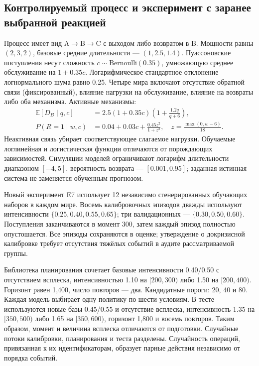 \documentclass[runningheads]{llncs}
\begin{document}
\subsection{Контролируемый процесс и эксперимент с заранее выбранной реакцией}
Процесс имеет вид A$\rightarrow$B$\rightarrow$C с выходом либо возвратом в B. Мощности равны $(2,3,2)$, базовые средние длительности --- $(1,2.5,1.4)$. Пуассоновские поступления несут сложность $c\sim\mathrm{Bernoulli}(0.35)$, умножающую среднее обслуживание на $1+0.35c$. Логарифмическое стандартное отклонение логнормального шума равно 0.25. Четыре мира включают отсутствие обратной связи (фиксированный), влияние нагрузки на обслуживание, влияние на возвраты либо оба механизма. Активные механизмы:
\begin{align}\label{eq:truth}
\mathbb E[D_B\mid q,c]&=2.5(1+0.35c)\left(1+\frac{1.2q}{q+6}\right),\\
P(R=1\mid w,c)&=0.04+0.03c+\frac{0.45z^2}{1+z^2},\quad z=\frac{\max(0,w-6)}{18}.
\end{align}
Неактивная связь убирает соответствующее слагаемое нагрузки. Обучаемые логлинейная и логистическая функции отличаются от порождающих зависимостей. Симуляции моделей ограничивают логарифм длительности диапазоном $[-4,5]$, вероятность возврата --- $[0.001,0.95]$; заданная истинная система не заменяется обученным прогнозом.

Новый эксперимент E7 использует 12 независимо сгенерированных обучающих наборов в каждом мире. Восемь калибровочных эпизодов дважды используют интенсивности $\{0.25,0.40,0.55,0.65\}$; три валидационных --- $\{0.30,0.50,0.60\}$. Поступления заканчиваются в момент 300, затем каждый эпизод полностью опустошается. Все эпизоды сохраняются в оценке; утверждение о докризисной калибровке требует отсутствия тяжёлых событий в аудите рассматриваемой группы.

Библиотека планирования сочетает базовые интенсивности 0.40/0.50 с отсутствием всплеска, интенсивностью 1.10 на $[200,300)$ либо 1.50 на $[200,400)$. Горизонт равен 1,400, число повторов --- два. Кандидатные пороги: 20, 40 и 80. Каждая модель выбирает одну политику по шести условиям. В тесте используются новые базы 0.45/0.55 и отсутствие всплеска, интенсивность 1.35 на $[350,500)$ либо 1.65 на $[350,600)$, горизонт 1,800 и восемь повторов. Таким образом, момент и величина всплеска отличаются от подготовки. Случайные потоки калибровки, планирования и теста разделены. Случайность операций, привязанная к их идентификаторам, образует парные действия независимо от порядка событий.
\end{document}
